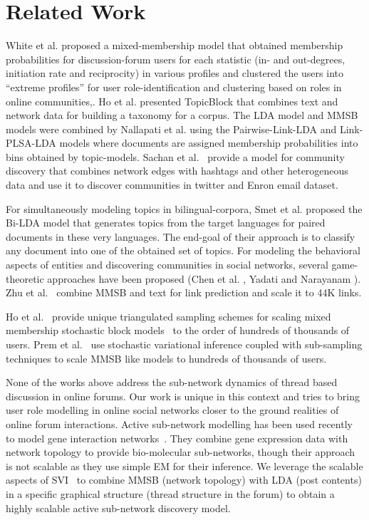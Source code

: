 \documentclass{sig-alternate}
\begin{document}
\section{Related Work}

White et al.\cite{ICWSM124638} proposed a mixed-membership model that obtained
membership probabilities for discussion-forum users for each statistic
(in- and out-degrees, initiation rate and reciprocity) in various profiles and
clustered the users into ``extreme profiles'' for user role-identification
and clustering based on roles in online communities,. Ho et al.
\cite{Ho:2012:DHT:2187836.2187936} presented TopicBlock that combines text and
network data for building a taxonomy for a corpus.
The LDA model and MMSB models were combined by
Nallapati et al. \cite{Nallapati:2008:JLT:1401890.1401957} using the
Pairwise-Link-LDA and Link-PLSA-LDA models where documents are assigned
membership probabilities into bins obtained by topic-models. Sachan et
al.~\cite{Sachan:2012:UCI:2187836.2187882} provide a model for community
discovery that combines network edges with hashtags and other heterogeneous data
and use it to discover communities in twitter and Enron email dataset.

For simultaneously modeling topics in bilingual-corpora, Smet et al.
\cite{Smet:2011:KTA:2017863.2017915} proposed the Bi-LDA model that generates
topics from the target languages for paired documents in these very languages.
The end-goal of their approach is to classify any document into one of the
obtained set of topics. For modeling the behavioral aspects of entities and
discovering communities in social networks, several game-theoretic approaches
have been proposed (Chen et al. \cite{Chen:2010:GFI:1842547.1842566}, Yadati and
Narayanam \cite{Yadati:2011:GTM:1963192.1963316}). Zhu et
al.~\cite{Zhu:getoor:MMSB-text} combine MMSB and text for link prediction and
scale it to 44K links.

Ho et al.~\cite{HoYX12} provide  unique triangulated sampling schemes for scaling
mixed membership stochastic block models~\cite{Airoldi:2008:MMS:1390681.1442798} to
the order of hundreds of thousands of users. Prem et
al.~\cite{conf/nips/GopalanMGFB12} use stochastic variational inference 
coupled with sub-sampling techniques to
scale MMSB like models to hundreds of thousands of users.


None of the works above address the sub-network dynamics of thread based
discussion in online forums. Our work is unique in this context and tries to
bring user role modelling in online social networks closer to the
ground realities of online forum interactions.
Active sub-network modelling has been used recently to model gene interaction 
networks~\cite{Lichtenstein:Charleston}. They
combine gene expression data with network topology to provide bio-molecular 
sub-networks, though their approach is not scalable as they use simple EM for
their inference. We leverage the scalable aspects of
SVI~\cite{Hoffman:2013:SVI} to combine MMSB (network topology) with LDA (post
contents) in a specific graphical structure (thread structure in the forum) to
obtain a highly scalable active sub-network discovery model.
\end{document}

